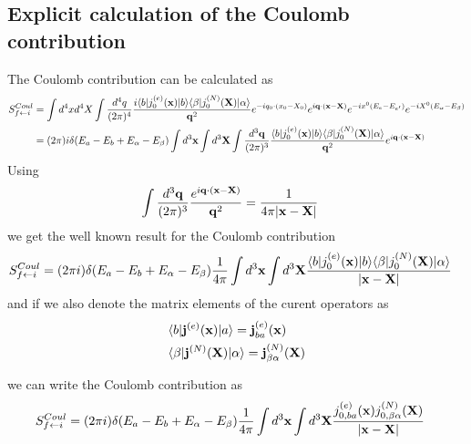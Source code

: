 \subsection{Explicit calculation of the Coulomb contribution}
The Coulomb contribution can be calculated as
\begin{align}
    S_{f\leftarrow i}^{Coul} & = \int d^4x d^4 X \int \frac{d^4 q}{(2\pi)^4} \frac{i\langle b| j^{(e)}_{0}({\bf x}) |b\rangle  \langle \beta| j^{(N)}_{0} ({\bf X}) |\alpha\rangle}{{\bf q}^2} e^{-i q_0 \cdot (x_0 - X_0)} e^{i{\bf q}\cdot({\bf x} - {\bf X})} e^{-ix^0(E_e-E_{e'})}e^{-iX^0(E_\alpha-E_{\beta})}\nonumber \\
                             & =(2\pi)i\delta(E_a-E_{b}+E_\alpha-E_{\beta})\int{d^3{\bf x}}\int d^3{\bf X} \int \frac{d^3 {\bf q}}{(2\pi)^3} \frac{\langle b| j^{(e)}_{0}({\bf x}) |b\rangle  \langle \beta| j^{(N)}_{0}({\bf X})  |\alpha\rangle}{{\bf q}^2} e^{i{\bf q}\cdot({\bf x} - {\bf X})}
\end{align}
Using
\begin{align}
    \int \frac{d^3 {\bf q}}{(2\pi)^3} \frac{e^{i{\bf q}\cdot({\bf x} - {\bf X})}}{{\bf q}^2} & = \frac{1}{4\pi |{\bf x} - {\bf X}|}
\end{align}
we get the well known result for the Coulomb contribution
\begin{align}
    S_{f\leftarrow i}^{Coul} & =(2\pi i)\delta(E_a-E_{b}+E_\alpha-E_{\beta}) \frac{1}{4\pi}\int{d^3{\bf x}}\int d^3{\bf X} \frac{\langle b| j^{(e)}_{0}({\bf x}) |b\rangle  \langle \beta| j^{(N)}_{0} ({\bf X})  |\alpha\rangle}{|{\bf x} - {\bf X}|}
\end{align}
and if we also denote the matrix elements of the curent operators as
\begin{align}
     & \langle b|{\bf j}^{(e)}({\bf x})|a \rangle = {\bf j}^{(e)}_{ba}({\bf x})                   \\
     & \langle \beta|{\bf j}^{(N)}({\bf X})|\alpha \rangle = {\bf j}^{(N)}_{\beta\alpha}({\bf X}) \\
\end{align}

we can write the Coulomb contribution as
\begin{align}
    S_{f\leftarrow i}^{Coul} & =(2\pi i)\delta(E_a-E_{b}+E_\alpha-E_{\beta}) \frac{1}{4\pi}\int{d^3{\bf x}}\int d^3{\bf X} \frac{j^{(e)}_{0,ba}({\bf x})  j^{(N)}_{0,\beta\alpha} ({\bf X})}{|{\bf x} - {\bf X}|}
\end{align}
